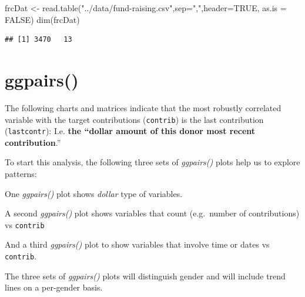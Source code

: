 \documentclass[
]{article}
\newenvironment{Shaded}{\begin{snugshade}}{\end{snugshade}}
\newcommand{\AttributeTok}[1]{\textcolor[rgb]{0.77,0.63,0.00}{#1}}
\newcommand{\CommentTok}[1]{\textcolor[rgb]{0.56,0.35,0.01}{\textit{#1}}}
\newcommand{\ConstantTok}[1]{\textcolor[rgb]{0.00,0.00,0.00}{#1}}
\newcommand{\DecValTok}[1]{\textcolor[rgb]{0.00,0.00,0.81}{#1}}
\newcommand{\FloatTok}[1]{\textcolor[rgb]{0.00,0.00,0.81}{#1}}
\newcommand{\FunctionTok}[1]{\textcolor[rgb]{0.00,0.00,0.00}{#1}}
\newcommand{\NormalTok}[1]{#1}
\newcommand{\OtherTok}[1]{\textcolor[rgb]{0.56,0.35,0.01}{#1}}
\newcommand{\StringTok}[1]{\textcolor[rgb]{0.31,0.60,0.02}{#1}}
\begin{document}
\begin{Shaded}
\begin{Highlighting}[]
\NormalTok{frcDat }\OtherTok{\textless{}{-}} \FunctionTok{read.table}\NormalTok{(}\StringTok{"../data/fund{-}raising.csv"}\NormalTok{,}\AttributeTok{sep=}\StringTok{","}\NormalTok{,}\AttributeTok{header=}\ConstantTok{TRUE}\NormalTok{, }\AttributeTok{as.is =} \ConstantTok{FALSE}\NormalTok{)}
\FunctionTok{dim}\NormalTok{(frcDat)}
\end{Highlighting}
\end{Shaded}

\begin{verbatim}
## [1] 3470   13
\end{verbatim}

\hypertarget{ggpairs}{%
\section{ggpairs()}\label{ggpairs}}

The following charts and matrices indicate that the most robustly
correlated variable with the target contributions (\texttt{contrib}) is
the last contribution (\texttt{lastcontr}): I.e. \textbf{the ``dollar
amount of this donor most recent contribution}.''

To start this analysis, the following three sets of \emph{ggpairs()}
plots help us to explore patterns:

One \emph{ggpairs()} plot shows \emph{dollar} type of variables.

A second \emph{ggpairs()} plot shows variables that count (e.g.~number
of contributions) vs \texttt{contrib}

And a third \emph{ggpairs()} plot to show variables that involve time or
dates vs \texttt{contrib}.

The three sets of \emph{ggpairs()} plots will distinguish gender and
will include trend lines on a per-gender basis.

\begin{Shaded}
\end{Shaded}
\end{document}
